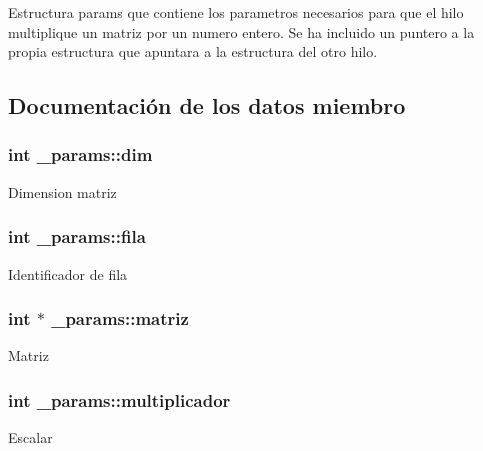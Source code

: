 Estructura params que contiene los parametros necesarios para que el hilo multiplique un matriz por un numero entero. Se ha incluido un puntero a la propia estructura que apuntara a la estructura del otro hilo. 

\subsection{Documentación de los datos miembro}
\subsubsection[{\texorpdfstring{dim}{dim}}]{\setlength{\rightskip}{0pt plus 5cm}int \+\_\+params\+::dim}\hypertarget{struct__params_aecffef63bfeb1c33b37bd5df12a98401}{}\label{struct__params_aecffef63bfeb1c33b37bd5df12a98401}
Dimension matriz 
\subsubsection[{\texorpdfstring{fila}{fila}}]{\setlength{\rightskip}{0pt plus 5cm}int \+\_\+params\+::fila}\hypertarget{struct__params_a8ebf07d62261f18feb39cad26d027616}{}\label{struct__params_a8ebf07d62261f18feb39cad26d027616}
Identificador de fila 
\subsubsection[{\texorpdfstring{matriz}{matriz}}]{\setlength{\rightskip}{0pt plus 5cm}int $\ast$ \+\_\+params\+::matriz}\hypertarget{struct__params_a04b3f21e1f7c21b17a510c2a4ee0e552}{}\label{struct__params_a04b3f21e1f7c21b17a510c2a4ee0e552}
Matriz 
\subsubsection[{\texorpdfstring{multiplicador}{multiplicador}}]{\setlength{\rightskip}{0pt plus 5cm}int \+\_\+params\+::multiplicador}\hypertarget{struct__params_a142e538b8c88b8748ad390b6a86fe17d}{}\label{struct__params_a142e538b8c88b8748ad390b6a86fe17d}
Escalar 
